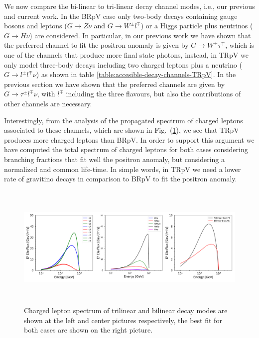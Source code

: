 \documentclass[a4paper,11pt]{article}
\begin{document}
We now compare the bi-linear to tri-linear decay channel modes, i.e., our previous and current work. 
In the BRpV case only two-body decays containing gauge bosons and leptons ($G\rightarrow Z \nu$ and $G\rightarrow W^{\pm} l^{\mp}$) or a Higgs particle plus neutrinos ($G\rightarrow H\nu$) are considered. In particular, in our previous work we have shown that the preferred channel to fit the positron anomaly is given by $G\rightarrow W^{\pm} \tau^{\mp}$, which is one of the channels that produce more final state photons, instead, in TRpV we only model three-body decays including two charged leptons plus a neutrino ($G\rightarrow l^{\pm} l^{\mp} \nu$) as shown in table \ref{table:accesible-decay-channels-TRpV}. In the previous section we have shown that the preferred channels are given by $G\rightarrow \tau^{\pm} l^{\mp} \nu$, with $l^{\mp}$ including the three flavours, but also the contributions of other channels are necessary.   

Interestingly, from the analysis of the propagated spectrum of charged leptons associated to these channels, which are shown in Fig.~(\ref{fig:positron-spectrum}), we see that TRpV produces more charged leptons than BRpV. In order to support this argument we have computed the total spectrum of charged leptons for both cases considering branching fractions that fit well the positron anomaly, but considering a normalized and common life-time. In simple words, in TRpV we need a lower rate of gravitino decays in comparison to BRpV to fit the positron anomaly.


\begin{figure}[htb]
\begin{center}
\includegraphics[height=6cm,width=16cm,angle=0]{Figures/exp_plots_electron_flux_comparison.pdf}
\caption{Charged lepton spectrum of trilinear and bilinear decay modes are shown at the left and center pictures respectively, the best fit for both cases are shown on the right picture.}
\label{fig:positron-spectrum}
\end{center}
\end{figure}
\end{document}
